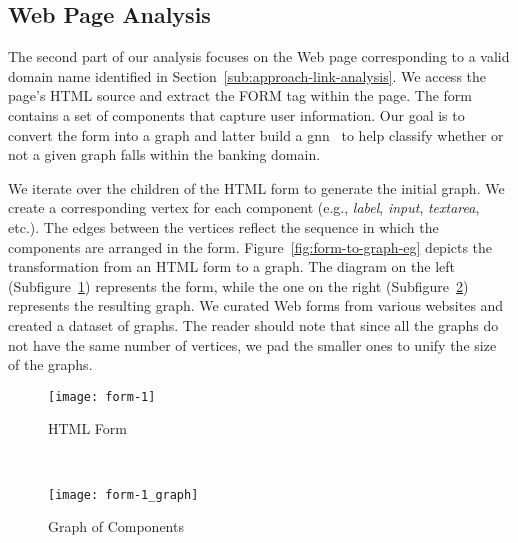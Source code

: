 

\subsection{Web Page Analysis} %
\label{sub:approach-web-page-analysis}

The second part of our analysis focuses on the Web page corresponding to a valid domain name identified in Section~\ref{sub:approach-link-analysis}. We access the page's HTML source and extract the FORM tag within the page. The form contains a set of components that capture user information. Our goal is to convert the form into a graph and latter build a \gls{gnn}~\cite{wu-pan-chen-long-zhang-yu:2021} to help classify whether or not a given graph falls within the banking domain. 

We iterate over the children of the HTML form to generate the initial graph. We create a corresponding vertex for each component (e.g., \emph{label}, \emph{input}, \emph{textarea}, etc.). The edges between the vertices reflect the sequence in which the components are arranged in the form.  Figure~\ref{fig:form-to-graph-eg} depicts the transformation from an HTML form to a graph. The diagram on the left (Subfigure~\ref{fig:init-form}) represents the form, while the one on the right (Subfigure~\ref{fig:final-form}) represents the resulting graph. We curated Web forms from various websites and created a dataset of graphs. The reader should note that since all the graphs do not have the same number of vertices, we pad the smaller ones to unify the size of the graphs.

\begin{figure*}[th!]
    \centering
    \begin{subfigure}[t]{0.5\textwidth}
        \centering
        \texttt{[image: form-1]}
        \caption{HTML Form}
        \label{fig:init-form}
    \end{subfigure}%
    ~ 
    \begin{subfigure}[t]{0.5\textwidth}
        \centering
        \texttt{[image: form-1\_graph]}
        \caption{Graph of Components}
        \label{fig:final-form}
    \end{subfigure}
    \caption{From Form to Graph}
    \label{fig:form-to-graph-eg}
\end{figure*}

